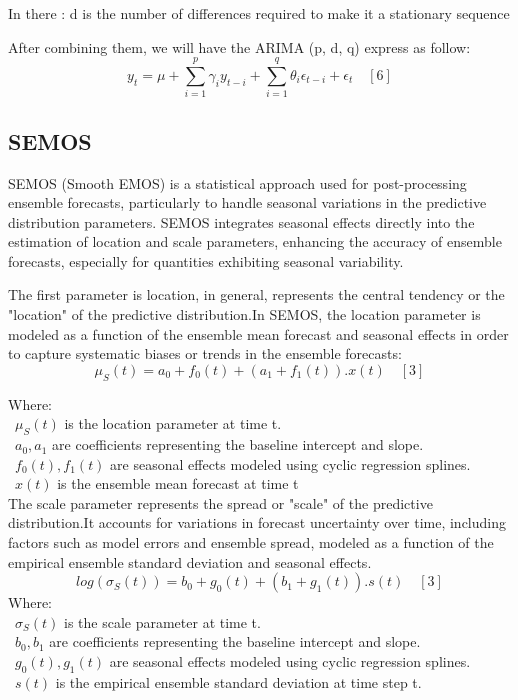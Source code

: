 \documentclass{ieeeojies}
\begin{document}
In there : d is the number of differences required to make it a stationary sequence 

After combining them, we will have the ARIMA (p, d, q) express as follow:
$$
y_t=\mu+\sum_{i=1}^p \gamma_i y_{t-i}+\sum_{i=1}^q \theta_i \epsilon_{t-i}+\epsilon_t \quad [6]
$$
\subsection{SEMOS}
SEMOS (Smooth EMOS) is a statistical approach used for post-processing ensemble forecasts, particularly to handle seasonal variations in the predictive distribution parameters. SEMOS integrates seasonal effects directly into the estimation of location and scale parameters, enhancing the accuracy of ensemble forecasts, especially for quantities exhibiting seasonal variability.

The first parameter is location, in general, represents the central tendency or the "location" of the predictive distribution.In SEMOS, the location parameter is modeled as a function of the ensemble mean forecast and seasonal effects in order to capture systematic biases or trends in the ensemble forecasts:
$$
\mu_S(t) = a_0 + f_0(t) + (a_1 + f_1(t)) . x(t) \quad[3]
$$

Where: \\
        \indent\textbullet\ \(\mu_S(t)\) is the location parameter at time t. \\
        \indent\textbullet\ \(a_0, a_1\) are coefficients representing the baseline intercept and slope. \\
        \indent\textbullet\ \(f_0(t), f_1(t)\) are seasonal effects modeled using cyclic regression splines. \\
        \indent\textbullet\ \(x(t)\) is the ensemble mean forecast at time t \\

The scale parameter represents the spread or "scale" of the predictive distribution.It accounts for variations in forecast uncertainty over time, including factors such as model errors and ensemble spread, modeled as a function of the empirical ensemble standard deviation and seasonal effects.
\[log(\sigma_S(t)) = b_0 + g_0(t) + (b_1 + g_1(t)).s(t) \quad[3]\]
Where: \\
        \indent\textbullet\ \(\sigma_S(t)\) is the scale parameter at time t. \\
        \indent\textbullet\ \(b_0, b_1\) are coefficients representing the baseline intercept and slope. \\
        \indent\textbullet\ \(g_0(t), g_1(t)\) are seasonal effects modeled using cyclic regression splines. \\
        \indent\textbullet\ \(s(t)\) is the empirical ensemble standard deviation at time step t.
\end{document}
